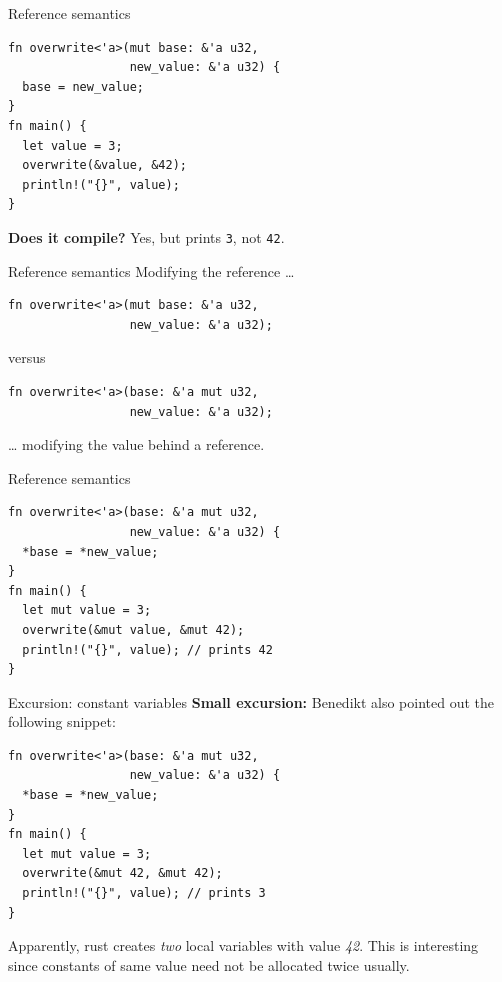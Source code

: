 \documentclass{beamer}
\begin{document}
\begin{frame}[fragile]{Reference semantics}
  \begin{verbatim}
fn overwrite<'a>(mut base: &'a u32,
                 new_value: &'a u32) {
  base = new_value;
}
fn main() {
  let value = 3;
  overwrite(&value, &42);
  println!("{}", value);
}
  \end{verbatim}
  \textbf{Does it compile?} \pause Yes, but prints \texttt{3}, not \texttt{42}.
\end{frame}

\begin{frame}[fragile]{Reference semantics}
  Modifying the reference \dots
  \begin{verbatim}
fn overwrite<'a>(mut base: &'a u32,
                 new_value: &'a u32);
  \end{verbatim}
  versus
  \begin{verbatim}
fn overwrite<'a>(base: &'a mut u32,
                 new_value: &'a u32);
  \end{verbatim}
  \dots{} modifying the value behind a reference.
\end{frame}

\begin{frame}[fragile]{Reference semantics}
  \begin{verbatim}
fn overwrite<'a>(base: &'a mut u32,
                 new_value: &'a u32) {
  *base = *new_value;
}
fn main() {
  let mut value = 3;
  overwrite(&mut value, &mut 42);
  println!("{}", value); // prints 42
}
  \end{verbatim}
\end{frame}

\begin{frame}[fragile]{Excursion: constant variables}
  \textbf{Small excursion:}
  Benedikt also pointed out the following snippet:
  \begin{verbatim}
fn overwrite<'a>(base: &'a mut u32,
                 new_value: &'a u32) {
  *base = *new_value;
}
fn main() {
  let mut value = 3;
  overwrite(&mut 42, &mut 42);
  println!("{}", value); // prints 3
}
  \end{verbatim}
  Apparently, rust creates \emph{two} local variables with value \emph{42}.
  This is interesting since constants of same value need not be allocated twice usually.
\end{frame}
\end{document}
